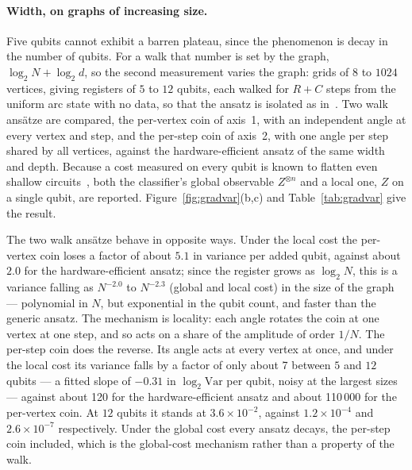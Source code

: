 \paragraph*{Width, on graphs of increasing size.}
Five qubits cannot exhibit a barren plateau, since the phenomenon is decay in
the number of qubits. For a walk that number is set by the graph, $\log_2 N +
\log_2 d$, so the second measurement varies the graph: grids of $8$ to
$1024$ vertices, giving registers of $5$ to $12$ qubits, each walked for
$R + C$ steps from the uniform arc state with no data, so that the ansatz is
isolated as in~\cite{McClean_2018}. Two walk ansätze are compared, the
per-vertex coin of axis~1, with an independent angle at every vertex and
step, and the per-step coin of axis~2, with one angle per step shared by all
vertices, against the hardware-efficient ansatz of the same width and depth.
Because a cost measured on every qubit is known to flatten even shallow
circuits~\cite{Larocca_2025}, both the classifier's global observable
$Z^{\otimes n}$ and a local one, $Z$ on a single qubit, are reported.
Figure~\ref{fig:gradvar}(b,c) and Table~\ref{tab:gradvar} give the result.

The two walk ansätze behave in opposite ways. Under the local cost the
per-vertex coin loses a factor of about $5.1$ in variance per added
qubit, against about $2.0$ for the hardware-efficient ansatz; since the
register grows as $\log_2 N$, this is a variance falling as
$N^{-2.0}$ to
$N^{-2.3}$ (global and local cost) in the size
of the graph --- polynomial in $N$, but exponential in the
qubit count, and faster than the generic ansatz. The mechanism is locality:
each angle rotates the coin at one vertex at one step, and so acts on a share
of the amplitude of order $1/N$. The per-step coin does the reverse. Its
angle acts at every vertex at once, and under the local cost its variance
falls by a factor of only about 7 between $5$ and
$12$ qubits --- a fitted slope of $-0.31$ in
$\log_2 \mathrm{Var}$ per qubit, noisy at the largest sizes --- against
about 120 for the hardware-efficient ansatz and
about 110\,000 for the per-vertex coin. At $12$
qubits it stands at $3.6 \times 10^{-2}$, against $1.2 \times 10^{-4}$ and $2.6 \times 10^{-7}$
respectively. Under the global cost every ansatz
decays, the per-step coin included, which is the global-cost mechanism rather
than a property of the walk.

